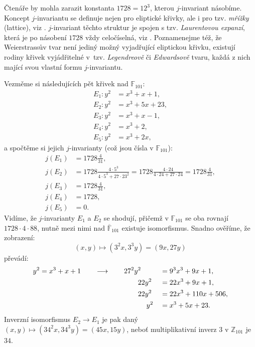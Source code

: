 \documentclass[12pt]{report}
\begin{document}
\begin{poznamka}
Čtenáře by mohla zarazit konstanta $1728 = 12^3$, kterou $j$-invariant násobíme. Koncept $j$-invariantu se definuje nejen pro eliptické křivky, ale i pro tzv. \textit{mřížky} (lattice), viz \cite[Def. 16.2]{Sutherland}. $j$-invariant těchto struktur je spojen s tzv. \textit{Laurentovou expanzí}, která je po násobení $1728$ vždy celočíselná, viz \cite[Ch. 11]{Cox}. Poznamenejme též, že Weierstrassův tvar není jediný možný vyjadřující eliptickou křivku, existují rodiny křivek vyjádřitelné v~tzv. \textit{Legendreově} či \textit{Edwardsově} tvaru, každá z nich mající svou vlastní formu $j$-invariantu. 
\end{poznamka}
\begin{priklad}
Vezměme si následujících pět křivek nad $\mathbb{F}_{101}$:
\begin{align*}
E_1 : y^2 &= x^3+x+1,\\
E_2 : y^2 &= x^3+5x+23,\\
E_3 : y^2 &= x^3+x-1,\\
E_4 : y^2 &= x^3+2,\\
E_5 : y^2 &= x^3+2x,
\end{align*}
a spočtěme si jejich $j$-invarianty (což jsou čísla v $\mathbb{F}_{101}$):
\begin{align*}
j(E_1) &= 1728 \frac{4}{31},\\
j(E_2) &= 1728 \frac{4 \cdot 5^3}{4 \cdot 5^3+27 \cdot 23^2} = 1728 \frac{4 \cdot 24}{4 \cdot 24 + 27 \cdot 24} = 1728 \frac{4}{31},\\
j(E_3) &= 1728 \frac{4}{31},\\
j(E_4) &= 1728,\\
j(E_5) &= 0.
\end{align*}
Vidíme, že $j$-invarianty $E_1$ a $E_2$ se shodují, přičemž v $\mathbb{F}_{101}$ se oba rovnají $1728 \cdot 4 \cdot 88$, nutně mezi nimi nad $\overline{\mathbb{F}}_{101}$ existuje isomorfismus. Snadno ověříme, že zobrazení:
\begin{equation*}
(x,y) \longmapsto (3^2 x, 3^3 y) = (9x,27y) 
\end{equation*}
převádí:
\begin{alignat*}{3}
y^2 &= x^3+x+1 \qquad \longrightarrow \qquad 27^2 y^2&&= 9^3 x^3 + 9x + 1,\\
&\qquad \hspace*{4.225cm}  22y^2&&= 22 x^3 + 9x + 1,\\
&\qquad \hspace*{4.225cm} 22y^2&&= 22 x^3 + 110x + 506,\\
&\qquad \hspace*{4.65cm} y^2&&= x^3 + 5x + 23.
\end{alignat*}
Inverzní isomorfismus $E_2 \longrightarrow E_1$ je pak daný $(x,y) \mapsto (34^2 x, 34^3 y) = (45x,15y)$, neboť multiplikativní inverz $3$ v $\mathbb{Z}_{101}$ je $34$.


\end{priklad}
\end{document}
